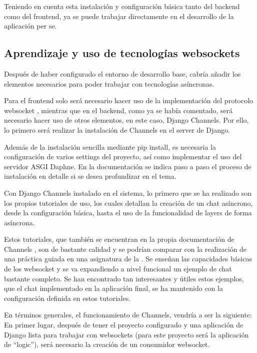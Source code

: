 Teniendo en cuenta esta instalación y configuración básica tanto del backend como del frontend, ya se puede trabajar directamente en el desarrollo de
la aplicación per se.

\subsection{Aprendizaje y uso de tecnologías websockets} 

Después de haber configurado el entorno de desarrollo base, cabría añadir los elementos necesarios para poder 
trabajar con tecnologías asíncronas.

Para el frontend solo será necesario hacer uso de la implementación del protocolo websocket \cite{websocketMDN}, mientras que en el 
backend, como ya se había comentado, será necesario hacer uso de otros elementos, en este caso, Django Channels. 
Por ello, lo primero será realizar la instalación de Channels en el server de Django.

Además de la instalación sencilla mediante pip install, es necesaria la configuración de varios settings del proyecto, así
como implementar el uso del servidor ASGI Daphne. En la documentación \cite{djangoChannelsInstall} se indica paso a paso el proceso 
de instalación en detalle si se desea profundizar en el tema.

Con Django Channels instalado en el sistema, lo primero que se ha realizado son los propios tutoriales de uso, los cuales detallan 
la creación de un chat asíncrono, desde la configuración básica, hasta el uso de la funcionalidad de layers de forma asíncrona.

Estos tutoriales, que también se encuentran en la propia documentación de Channels \cite{djangoChannelsTutorial}, son 
de bastante calidad y se podrían comparar con la realización de una práctica guiada en una asignatura de la 
\escuelalargo. Se enseñan las capacidades básicas de los websocket y se va expandiendo a nivel funcional un ejemplo
de chat bastante completo. Se han encontrado tan interesantes y útiles estos ejemplos, que el chat implementado
en la aplicación final, se ha mantenido con la configuración definida en estos tutoriales.

En términos generales, el funcionamiento de Channels, vendría a ser la siguiente: En primer lugar, después de tener el proyecto configurado y una aplicación de Django lista para
trabajar con websockets (para este proyecto será la aplicación de ``logic''), será necesario la creación de un 
consumidor websocket.

